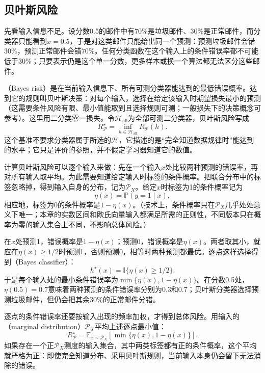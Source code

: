 \subsection{贝叶斯风险}
\label{sec:bayes-risk}

先看输入信息不足。设分数0.5的邮件中有70\%是垃圾邮件、30\%是正常邮件，而分类器只能看到$x=0.5$，于是对这类邮件只能给出同一个预测：预测垃圾邮件会错30\%，预测正常邮件会错70\%。任何分类函数在这个输入上的条件错误率都不可能低于30\%；只要表示仍是这个单一分数，更多样本或换一个算法都无法区分这些邮件。

（Bayes risk）是在当前输入信息下、所有可测分类器能达到的最低错误概率。达到它的规则叫贝叶斯决策：对每个输入，选择在给定该输入时期望损失最小的预测（这需要条件风险有限、最小值能取到且选择规则可测；一般损失下的决策概念可参考）。这里用二分类零一损失。令$\mathcal H_{\mathrm{all}}$为全部可测二分类器，贝叶斯风险写成
\begin{equation}
 R_{\mathcal P}^\star=\inf_{h\in\mathcal H_{\mathrm{all}}}R_{\mathcal P}(h).
 \label{eq:bayes-risk}
\end{equation}
这个基准不要求分类器属于所选的$\mathcal H$，它描述的是“完全知道数据规律时”能达到的水平；它只是评价的参照，并不假定学习器知道它的数值。

计算贝叶斯风险可以逐个输入来做：先在一个输入$x$处比较两种预测的错误率，再对所有输入取平均。为此需要知道给定输入时标签的条件概率。把联合分布中的标签忽略掉，得到输入自身的分布，记为$\mathcal P_X$。给定$x$时标签为1的条件概率记为
\[
 \eta(x)=\mathbb P(y=1\mid x),
\]
相应地，标签为0的条件概率是$1-\eta(x)$。（技术上，条件概率只在$\mathcal P_X$几乎处处意义下唯一；本章的实数区间和欧氏向量输入都满足所需的正则性，不同版本只在概率为零的输入集合上不同，不影响总体风险。）

在$x$处预测1，错误概率是$1-\eta(x)$；预测0，错误概率是$\eta(x)$。两者取其小，就应在$\eta(x)\geq1/2$时预测1，否则预测0，相等时两种预测都最优。逐点这样选择得到（Bayes classifier）：
\[
 h^\star(x)=\mathbb I\{\eta(x)\geq1/2\}.
\]
于是每个输入处的最小条件错误率为$\min\{\eta(x),1-\eta(x)\}$。在分数0.5处，$\eta(0.5)=0.7$意味着两种预测的条件错误率分别为0.3和0.7；贝叶斯分类器选择预测垃圾邮件，但仍会把其余30\%的正常邮件分错。

逐点的条件错误率还要按输入出现的频率加权，才得到总体风险。用输入的（marginal distribution）$\mathcal P_X$平均上述逐点最小值：
\begin{equation}
 R_{\mathcal P}^\star=
 \mathbb E_{x\sim\mathcal P_X}[\min\{\eta(x),1-\eta(x)\}].
 \label{eq:bayes-risk-pointwise}
\end{equation}
如果存在一个正$\mathcal P_X$测度的输入集合，其中两类标签都有正的条件概率，这个平均就严格为正：即使完全知道分布、采用贝叶斯规则，当前输入本身仍会留下无法消除的错误。

